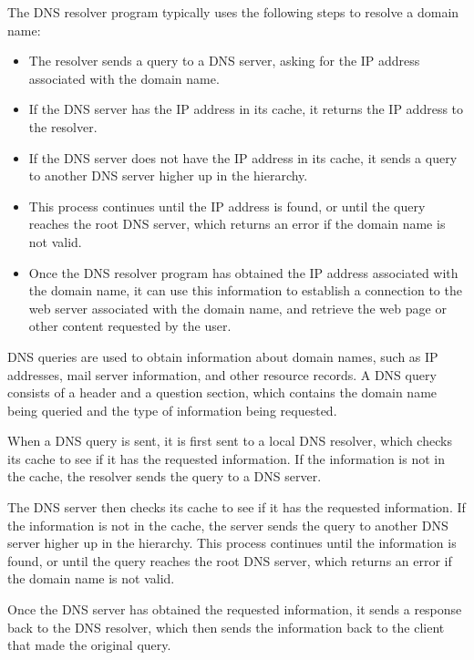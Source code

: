 \documentclass[a4paper, 11pt]{article}
\begin{document}
        The DNS resolver program typically uses the following steps to resolve a domain name:
        \begin{itemize}
            \item The resolver sends a query to a DNS server, asking for the IP address associated with the domain name.
            \item If the DNS server has the IP address in its cache, it returns the IP address to the resolver.
            \item If the DNS server does not have the IP address in its cache, it sends a query to another DNS server higher up in the hierarchy.
            \item This process continues until the IP address is found, or until the query reaches the root DNS server, 
                which returns an error if the domain name is not valid.
            \item Once the DNS resolver program has obtained the IP address associated with the domain name, 
                it can use this information to establish a connection to the web server associated with the domain name, 
                and retrieve the web page or other content requested by the user.
        \end{itemize}


        DNS queries are used to obtain information about domain names, such as IP addresses, mail server information, and other resource records.
        A DNS query consists of a header and a question section, which contains the domain name being queried and the type of information being requested.

        When a DNS query is sent, it is first sent to a local DNS resolver, which checks its cache to see if it has the requested information.
        If the information is not in the cache, the resolver sends the query to a DNS server.

        The DNS server then checks its cache to see if it has the requested information.
        If the information is not in the cache, the server sends the query to another DNS server higher up in the hierarchy.
        This process continues until the information is found, or until the query reaches the root DNS server, which returns an error if the domain name is not valid.

        Once the DNS server has obtained the requested information, it sends a response back to the DNS resolver, 
        which then sends the information back to the client that made the original query.
\end{document}
